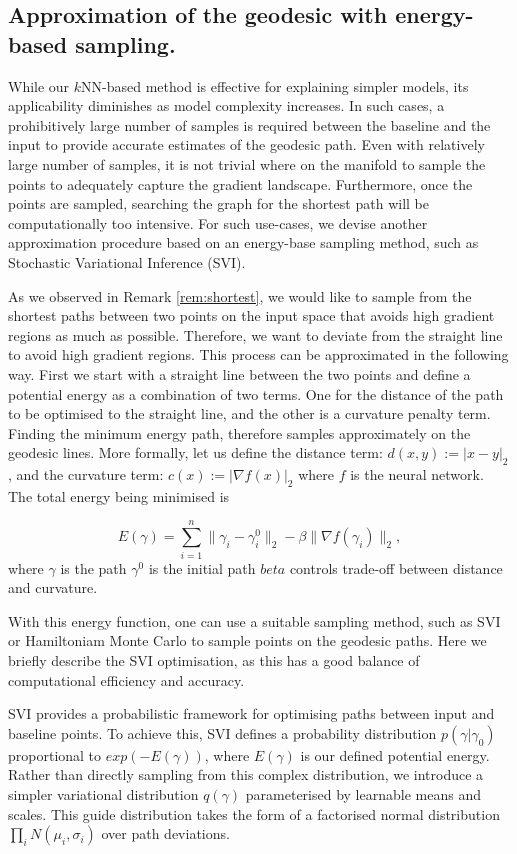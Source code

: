 \subsection{Approximation of the geodesic with energy-based sampling.}
While our $k$NN-based method is effective for explaining simpler models, its applicability diminishes as model complexity increases. In such cases, a prohibitively large number of samples is required between the baseline and the input to provide accurate estimates of the geodesic path. Even with relatively large number of samples, it is not trivial where on the manifold to sample the points to adequately capture the gradient landscape. Furthermore, once the points are sampled, searching the graph for the shortest path will be computationally too intensive. For such use-cases, we devise another approximation procedure based on an energy-base sampling method, such as Stochastic Variational Inference (SVI).

As we observed in Remark \ref{rem:shortest}, we would like to sample from the shortest paths between two points on the input space that avoids high gradient regions as much as possible. Therefore, we want to deviate from the straight line to avoid high gradient regions. This process can be approximated in the following way. First we start with a straight line between the two points and define a potential energy as a combination of two terms. One for the distance of the path to be optimised to the straight line,  and the other is a curvature penalty term. Finding the minimum energy path, therefore samples approximately on the geodesic lines. More formally, let us define the distance term: $d(x,y) := |x-y|_2$, and the curvature term: $c(x):=|\nabla f(x)|_2$ where $f$ is the neural network. The total energy being minimised is

\begin{equation}
E(\gamma) = \sum_{i=1}^{n} \|\gamma_i - \gamma^0_i\|_2 - \beta\|\nabla f(\gamma_i)\|_2, 
\end{equation}
where $\gamma$ is the path $\gamma^0$ is the initial path $beta$ controls trade-off between distance and curvature.

With this energy function, one can use a suitable sampling method, such as SVI or Hamiltoniam Monte Carlo to sample points on the geodesic paths. Here we briefly describe the SVI optimisation, as this has a good balance of computational efficiency and accuracy.

SVI provides a probabilistic framework for optimising paths between input and baseline points. To achieve this, SVI defines a probability distribution $p(\gamma|\gamma_0)$ proportional to $exp(-E(\gamma))$, where $E(\gamma)$ is our defined potential energy. Rather than directly sampling from this complex distribution, we introduce a simpler variational distribution $q(\gamma)$ parameterised by learnable means and scales. This guide distribution takes the form of a factorised normal distribution $\prod_i N(\mu_i,\sigma_i)$ over path deviations.

